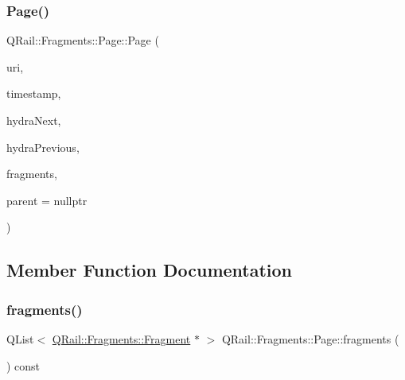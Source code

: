 \subsubsection{\texorpdfstring{Page()}{Page()}\hspace{0.1cm}{\footnotesize\ttfamily [2/2]}}
{\footnotesize\ttfamily Q\+Rail\+::\+Fragments\+::\+Page\+::\+Page (\begin{DoxyParamCaption}\item[{const Q\+Url \&}]{uri,  }\item[{const Q\+Date\+Time \&}]{timestamp,  }\item[{const Q\+Url \&}]{hydra\+Next,  }\item[{const Q\+Url \&}]{hydra\+Previous,  }\item[{const Q\+List$<$ \mbox{\hyperlink{classQRail_1_1Fragments_1_1Fragment}{Q\+Rail\+::\+Fragments\+::\+Fragment}} $\ast$ $>$ \&}]{fragments,  }\item[{Q\+Object $\ast$}]{parent = {\ttfamily nullptr} }\end{DoxyParamCaption})\hspace{0.3cm}{\ttfamily [explicit]}}



\subsection{Member Function Documentation}
\mbox{\label{classQRail_1_1Fragments_1_1Page_a24f93fc23c2f2795fc3d662aed48c7d9}} 
\subsubsection{\texorpdfstring{fragments()}{fragments()}}
{\footnotesize\ttfamily Q\+List$<$ \mbox{\hyperlink{classQRail_1_1Fragments_1_1Fragment}{Q\+Rail\+::\+Fragments\+::\+Fragment}} $\ast$ $>$ Q\+Rail\+::\+Fragments\+::\+Page\+::fragments (\begin{DoxyParamCaption}{ }\end{DoxyParamCaption}) const}

\mbox{\label{classQRail_1_1Fragments_1_1Page_a7403651ceb8ea2d7fb8c13ae9b46dc44}} 
